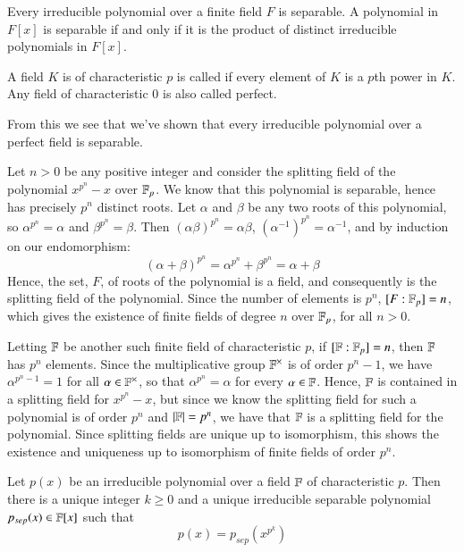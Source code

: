 \documentclass[12pt, a4paper, oneside, openright, titlepage]{book}
\begin{document}
\begin{prop}
    Every irreducible polynomial over a finite field $F$ is separable. A polynomial in $F[x]$ is separable if and only if it is the product of distinct irreducible polynomials in $F[x]$.
\end{prop}

\begin{defn}
    A field $K$ is of characteristic $p$ is called  if every element of $K$ is a $p$th power in $K$. Any field of characteristic $0$ is also called perfect.
\end{defn}

From this we see that we've shown that every irreducible polynomial over a perfect field is separable.


\begin{eg}
    Let $n > 0$ be any positive integer and consider the splitting field of the polynomial $x^{p^n}-x$ over $\mathbb F_p$. We know that this polynomial is separable, hence has precisely $p^n$ distinct roots. Let $\alpha$ and $\beta$ be any two roots of this polynomial, so $\alpha^{p^n} = \alpha$ and $\beta^{p^n} = \beta$. Then $(\alpha\beta)^{p^n} = \alpha\beta$, $(\alpha^{-1})^{p^n} = \alpha^{-1}$, and by induction on our endomorphism: \begin{equation*}
        (\alpha+\beta)^{p^n} = \alpha^{p^n}+\beta^{p^n} = \alpha+\beta
    \end{equation*}
    Hence, the set, $F$, of roots of the polynomial is a field, and consequently is the splitting field of the polynomial. Since the number of elements is $p^n$, $[F:\mathbb F_p] = n$, which gives the existence of finite fields of degree $n$ over $\mathbb F_p$, for all $n > 0$.

    Letting $\mathbb F$ be another such finite field of characteristic $p$, if $[\mathbb F:\mathbb F_p] = n$, then $\mathbb F$ has $p^n$ elements. Since the multiplicative group $\mathbb F^{\times}$ is of order $p^n-1$, we have $\alpha^{p^n-1} = 1$ for all $\alpha \in \mathbb F^{\times}$, so that $\alpha^{p^n} = \alpha$ for every $\alpha \in \mathbb F$. Hence, $\mathbb F$ is contained in a splitting field for $x^{p^n}-x$, but since we know the splitting field for such a polynomial is of order $p^n$ and $|\mathbb F| = p^n$, we have that $\mathbb F$ is a splitting field for the polynomial. Since splitting fields are unique up to isomorphism, this shows the existence and uniqueness up to isomorphism of finite fields of order $p^n$.
\end{eg}

\begin{prop}
    Let $p(x)$ be an irreducible polynomial over a field $\mathbb F$ of characteristic $p$. Then there is a unique integer $k\geq 0$ and a unique irreducible separable polynomial $p_{sep}(x) \in \mathbb F[x]$ such that \begin{equation*}
        p(x) = p_{sep}(x^{p^k})
    \end{equation*}
\end{prop}
\end{document}
